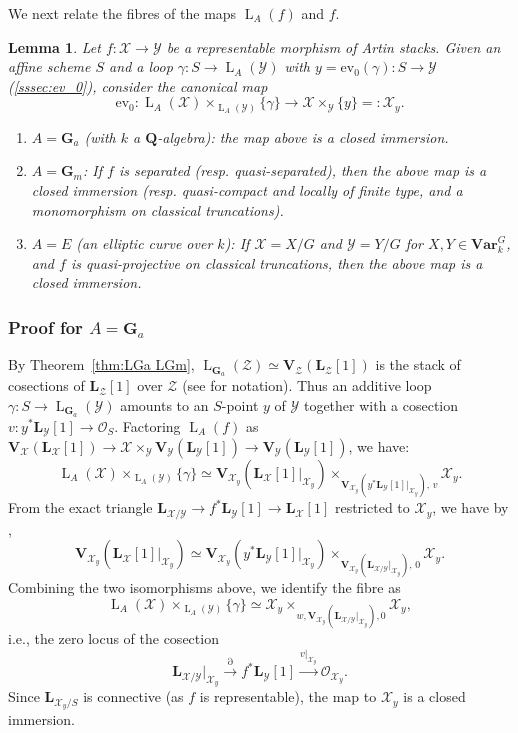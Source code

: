 \documentclass[12pt, oneside]{amsart}
\numberwithin{equation}{section}
\newtheorem{lemma}[subsubsection]{Lemma}
\theoremstyle{remark}
\theoremstyle{plain}
\newcommand{\Loop}{\operatorname{L}}
\newcommand{\OO}{\mathcal{O}}
\newcommand{\YY}{\mathcal{Y}}
\newcommand{\ZZ}{\mathcal{Z}}
\newcommand{\XX}{\mathcal{X}}
\newcommand{\GGa}{\mathbf{G}_{a}}
\newcommand{\GGm}{\mathbf{G}_{m}}
\newcommand{\Var}{\mathbf{Var}_{k}}
\newcommand{\LL}{\mathbf{L}}
\newcommand{\ev}{\mathrm{ev}}
\begin{document}
\subsubsection{}

We next relate the fibres of the maps $\Loop_A(f)$ and $f$.

\begin{lemma}\label{lem:loop fibre}
  Let $f : \XX \to \YY$ be a representable morphism of Artin stacks.
  Given an affine scheme $S$ and a loop $\gamma : S \to \Loop_A(\YY)$ with $y = \ev_0(\gamma) : S \to \YY$ (\ref{sssec:ev_0}), consider the canonical map
  \[ \ev_0 : \Loop_A(\XX) \times_{\Loop_A(\YY)} \{\gamma\} \to \XX \times_{\YY} \{y\} =: \XX_y. \]
  \begin{enumerate}
  \item $A = \GGa$ (with $k$ a $\mathbf{Q}$-algebra): the map above is a closed immersion.
  \item $A = \GGm$: If $f$ is separated (resp. quasi-separated), then the above map is a closed immersion (resp. quasi-compact and locally of finite type, and a monomorphism on classical truncations).
  \item $A = E$ (an elliptic curve over $k$): If $\XX = X/G$ and $\YY = Y/G$ for $X, Y \in \Var^G$, and $f$ is quasi-projective on classical truncations, then the above map is a closed immersion.
  \end{enumerate}
\end{lemma}

\subsubsection{Proof for $A=\GGa$}

By Theorem~\ref{thm:LGa LGm}, $\Loop_{\GGa}(\ZZ) \simeq \mathbf{V}_{\ZZ}(\LL_{\ZZ}[1])$ is the stack of cosections of $\LL_{\ZZ}[1]$ over $\ZZ$ (see \cite[App.~B]{weilres} for notation).
Thus an additive loop $\gamma : S \to \Loop_{\GGa}(\YY)$ amounts to an $S$-point $y$ of $\YY$ together with a cosection $v : y^*\LL_{\YY}[1] \to \OO_S$.
Factoring $\Loop_A(f)$ as $\mathbf{V}_{\XX}(\LL_{\XX}[1]) \to \XX \times_{\YY} \mathbf{V}_{\YY}(\LL_{\YY}[1]) \to \mathbf{V}_{\YY}(\LL_{\YY}[1])$, we have:
\[ \Loop_A(\XX) \times_{\Loop_A(\YY)} \{\gamma\} \simeq \mathbf{V}_{\XX_y}(\LL_{\XX}[1]|_{\XX_y}) \times_{\mathbf{V}_{\XX_y}(y^*\LL_{\YY}[1]|_{\XX_y}),\, v} \XX_y. \]
From the exact triangle $\LL_{\XX/\YY} \to f^*\LL_{\YY}[1] \to \LL_{\XX}[1]$ restricted to $\XX_y$, we have by \cite[Rem.~B.3]{weilres},
\[\mathbf{V}_{\XX_y}(\LL_{\XX}[1]|_{\XX_y}) \simeq \mathbf{V}_{\XX_y}(y^*\LL_{\YY}[1]|_{\XX_y}) \times_{\mathbf{V}_{\XX_y}(\LL_{\XX/\YY}|_{\XX_y}),\, 0} \XX_y.\]
Combining the two isomorphisms above, we identify the fibre as
\[
  \Loop_A(\XX) \times_{\Loop_A(\YY)} \{\gamma\} \simeq \XX_y \times_{w, \mathbf{V}_{\XX_y}(\LL_{\XX/\YY}|_{\XX_y}), 0} \XX_y,
\]
i.e., the zero locus of the cosection
\[\LL_{\XX/\YY}|_{\XX_y} \xrightarrow{\partial} f^*\LL_{\YY}[1] \xrightarrow{v|_{\XX_y}} \OO_{\XX_y}.\]
Since $\LL_{\XX_y/S}$ is connective (as $f$ is representable), the map to $\XX_y$ is a closed immersion.
\end{document}
